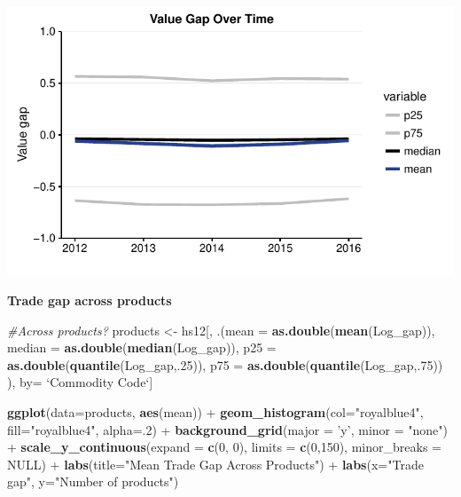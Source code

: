 \documentclass[10pt,]{article}
\newenvironment{Shaded}{\begin{snugshade}}{\end{snugshade}}
\newcommand{\KeywordTok}[1]{\textcolor[rgb]{0.13,0.29,0.53}{\textbf{{#1}}}}
\newcommand{\DataTypeTok}[1]{\textcolor[rgb]{0.13,0.29,0.53}{{#1}}}
\newcommand{\DecValTok}[1]{\textcolor[rgb]{0.00,0.00,0.81}{{#1}}}
\newcommand{\StringTok}[1]{\textcolor[rgb]{0.31,0.60,0.02}{{#1}}}
\newcommand{\CommentTok}[1]{\textcolor[rgb]{0.56,0.35,0.01}{\textit{{#1}}}}
\newcommand{\OtherTok}[1]{\textcolor[rgb]{0.56,0.35,0.01}{{#1}}}
\newcommand{\NormalTok}[1]{{#1}}
\begin{document}
\begin{center}\includegraphics{Figs/value_time-1} \end{center}

\textbf{Trade gap across products}

\begin{Shaded}
\begin{Highlighting}[]
\CommentTok{#Across products?}
\NormalTok{products <-}\StringTok{ }\NormalTok{hs12[, .(}\DataTypeTok{mean =} \KeywordTok{as.double}\NormalTok{(}\KeywordTok{mean}\NormalTok{(Log_gap)),}
                     \DataTypeTok{median =} \KeywordTok{as.double}\NormalTok{(}\KeywordTok{median}\NormalTok{(Log_gap)),}
                     \DataTypeTok{p25 =} \KeywordTok{as.double}\NormalTok{(}\KeywordTok{quantile}\NormalTok{(Log_gap,.}\DecValTok{25}\NormalTok{)),}
                     \DataTypeTok{p75 =} \KeywordTok{as.double}\NormalTok{(}\KeywordTok{quantile}\NormalTok{(Log_gap,.}\DecValTok{75}\NormalTok{))}
\NormalTok{),}
\NormalTok{by=}\StringTok{ `}\DataTypeTok{Commodity Code}\StringTok{`}\NormalTok{]}

\KeywordTok{ggplot}\NormalTok{(}\DataTypeTok{data=}\NormalTok{products, }\KeywordTok{aes}\NormalTok{(mean)) +}
\StringTok{  }\KeywordTok{geom_histogram}\NormalTok{(}\DataTypeTok{col=}\StringTok{"royalblue4"}\NormalTok{,}
                 \DataTypeTok{fill=}\StringTok{"royalblue4"}\NormalTok{,}
                 \DataTypeTok{alpha=}\NormalTok{.}\DecValTok{2}\NormalTok{) +}
\StringTok{  }\KeywordTok{background_grid}\NormalTok{(}\DataTypeTok{major =} \StringTok{'y'}\NormalTok{, }\DataTypeTok{minor =} \StringTok{"none"}\NormalTok{) +}
\StringTok{  }\KeywordTok{scale_y_continuous}\NormalTok{(}\DataTypeTok{expand =} \KeywordTok{c}\NormalTok{(}\DecValTok{0}\NormalTok{, }\DecValTok{0}\NormalTok{), }\DataTypeTok{limits =} \KeywordTok{c}\NormalTok{(}\DecValTok{0}\NormalTok{,}\DecValTok{150}\NormalTok{), }\DataTypeTok{minor_breaks =} \OtherTok{NULL}\NormalTok{) +}
\StringTok{  }\KeywordTok{labs}\NormalTok{(}\DataTypeTok{title=}\StringTok{"Mean Trade Gap Across Products"}\NormalTok{) +}
\StringTok{  }\KeywordTok{labs}\NormalTok{(}\DataTypeTok{x=}\StringTok{"Trade gap"}\NormalTok{, }\DataTypeTok{y=}\StringTok{"Number of products"}\NormalTok{)}
\end{Highlighting}
\end{Shaded}
\end{document}
